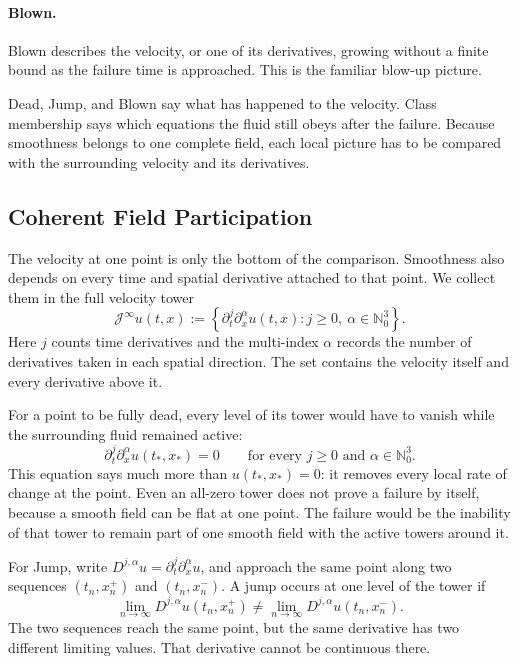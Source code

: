 \paragraph{Blown.}
Blown describes the velocity, or one of its derivatives, growing without a finite bound as the failure time is approached.
This is the familiar blow-up picture.

Dead, Jump, and Blown say what has happened to the velocity.
Class membership says which equations the fluid still obeys after the failure.
Because smoothness belongs to one complete field, each local picture has to be compared with the surrounding velocity and its derivatives.

\subsection{Coherent Field Participation}

The velocity at one point is only the bottom of the comparison.  Smoothness
also depends on every time and spatial derivative attached to that point.  We
collect them in the full velocity tower
\[
  \mathcal J^\infty u(t,x)
  :=
  \left\{
    \partial_t^j\partial_x^\alpha u(t,x):
    j\ge0,
    \ \alpha\in\mathbb N_0^3
  \right\}.
\]
Here \(j\) counts time derivatives and the multi-index \(\alpha\) records the
number of derivatives taken in each spatial direction.  The set contains the
velocity itself and every derivative above it.

For a point to be fully dead, every level of its tower would have to vanish
while the surrounding fluid remained active:
\[
  \partial_t^j\partial_x^\alpha u(t_*,x_*)=0
  \qquad\text{for every }j\ge0
  \text{ and }\alpha\in\mathbb N_0^3.
\]
This equation says much more than \(u(t_*,x_*)=0\): it removes every local rate
of change at the point.  Even an all-zero tower does not prove a failure by
itself, because a smooth field can be flat at one point.  The failure would be
the inability of that tower to remain part of one smooth field with the active
towers around it.

For Jump, write
\(D^{j,\alpha}u=\partial_t^j\partial_x^\alpha u\), and approach the same
point along two sequences \((t_n,x_n^+)\) and \((t_n,x_n^-)\).  A jump occurs
at one level of the tower if
\[
  \lim_{n\to\infty}D^{j,\alpha}u(t_n,x_n^+)
  \ne
  \lim_{n\to\infty}D^{j,\alpha}u(t_n,x_n^-).
\]
The two sequences reach the same point, but the same derivative has two
different limiting values.  That derivative cannot be continuous there.

